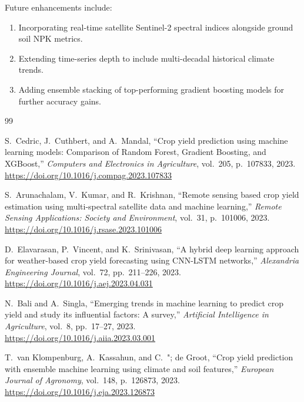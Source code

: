 \documentclass[11pt,a4paper]{article}
\begin{document}
Future enhancements include:
\begin{enumerate}
    \item Incorporating real-time satellite Sentinel-2 spectral indices alongside ground soil NPK metrics.
    \item Extending time-series depth to include multi-decadal historical climate trends.
    \item Adding ensemble stacking of top-performing gradient boosting models for further accuracy gains.
\end{enumerate}

\begin{thebibliography}{99}

S.~Cedric, J.~Cuthbert, and A.~Mandal, ``Crop yield prediction using machine learning models: Comparison of Random Forest, Gradient Boosting, and XGBoost,'' \emph{Computers and Electronics in Agriculture}, vol.~205, p.~107833, 2023. \\
\url{https://doi.org/10.1016/j.compag.2023.107833}

S.~Arunachalam, V.~Kumar, and R.~Krishnan, ``Remote sensing based crop yield estimation using multi-spectral satellite data and machine learning,'' \emph{Remote Sensing Applications: Society and Environment}, vol.~31, p.~101006, 2023. \\
\url{https://doi.org/10.1016/j.rsase.2023.101006}

D.~Elavarasan, P.~Vincent, and K.~Srinivasan, ``A hybrid deep learning approach for weather-based crop yield forecasting using CNN-LSTM networks,'' \emph{Alexandria Engineering Journal}, vol.~72, pp.~211--226, 2023. \\
\url{https://doi.org/10.1016/j.aej.2023.04.031}

N.~Bali and A.~Singla, ``Emerging trends in machine learning to predict crop yield and study its influential factors: A survey,'' \emph{Artificial Intelligence in Agriculture}, vol.~8, pp.~17--27, 2023. \\
\url{https://doi.org/10.1016/j.aiia.2023.03.001}

T.~van Klompenburg, A.~Kassahun, and C.~"; de Groot, ``Crop yield prediction with ensemble machine learning using climate and soil features,'' \emph{European Journal of Agronomy}, vol.~148, p.~126873, 2023. \\
\url{https://doi.org/10.1016/j.eja.2023.126873}


\end{thebibliography}
\end{document}
